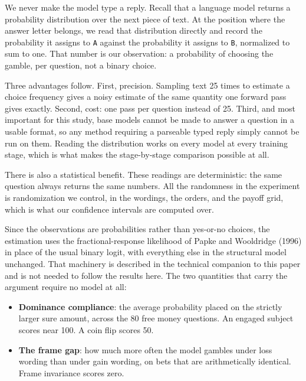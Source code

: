 \documentclass[11pt]{article}
\newcommand{\term}[1]{\textbf{\color{purpledk}#1}}
\begin{document}
\begin{keybox}
We never make the model type a reply. Recall that a language model returns a probability
distribution over the next piece of text. At the position where the answer letter belongs, we
read that distribution directly and record the probability it assigns to \texttt{A} against the
probability it assigns to \texttt{B}, normalized to sum to one. That number is our observation:
a probability of choosing the gamble, per question, not a binary choice.

Three advantages follow. First, precision. Sampling text 25 times to estimate a choice frequency
gives a noisy estimate of the same quantity one forward pass gives exactly. Second, cost: one
pass per question instead of 25. Third, and most important for this study, base models cannot be
made to answer a question in a usable format, so any method requiring a parseable typed reply
simply cannot be run on them. Reading the distribution works on every model at every training
stage, which is what makes the stage-by-stage comparison possible at all.

There is also a statistical benefit. These readings are deterministic: the same question always
returns the same numbers. All the randomness in the experiment is randomization we control, in
the wordings, the orders, and the payoff grid, which is what our confidence intervals are
computed over.
\end{keybox}

Since the observations are probabilities rather than yes-or-no choices, the estimation uses the
fractional-response likelihood of Papke and Wooldridge (1996) in place of the usual binary
logit, with everything else in the structural model unchanged. That machinery is described in the
technical companion to this paper and is not needed to follow the results here. The two
quantities that carry the argument require no model at all:

\begin{itemize}
  \item \term{Dominance compliance}: the average probability placed on the strictly larger sure
  amount, across the 80 free money questions. An engaged subject scores near 100. A coin flip
  scores 50.
  \item \term{The frame gap}: how much more often the model gambles under loss wording than
  under gain wording, on bets that are arithmetically identical. Frame invariance scores zero.
\end{itemize}
\end{document}

